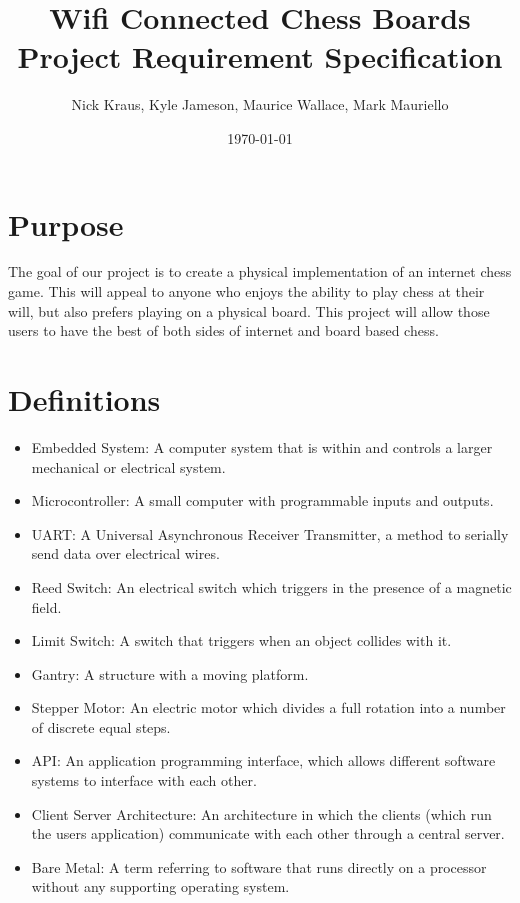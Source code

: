 \documentclass{article}
\title{Wifi Connected Chess Boards \\ \large Project Requirement Specification}
\author{Nick Kraus, Kyle Jameson, Maurice Wallace, Mark Mauriello}
\date{\today}
\begin{document}
\maketitle


\section*{Purpose}
\indent

The goal of our project is to create a physical implementation of an internet chess game. This will appeal to anyone who enjoys the ability to play chess at their will, but also prefers playing on a physical board. This project will allow those users to have the best of both sides of internet and board based chess.

\section*{Definitions}
\indent

\begin{itemize}
	
	\item Embedded System: A computer system that is within and controls a larger mechanical or electrical system.
	\item Microcontroller: A small computer with programmable inputs and outputs.
	\item UART: A Universal Asynchronous Receiver Transmitter, a method to serially send data over electrical wires.
	\item Reed Switch: An electrical switch which triggers in the presence of a magnetic field.
	\item Limit Switch: A switch that triggers when an object collides with it.
	\item Gantry: A structure with a moving platform.
	\item Stepper Motor: An electric motor which divides a full rotation into a number of discrete equal steps.
	\item API: An application programming interface, which allows different software systems to interface with each other.
	\item Client Server Architecture: An architecture in which the clients (which run the users application) communicate with each other through a central server.
	\item Bare Metal: A term referring to software that runs directly on a processor without any supporting operating system.

\end{itemize}
\end{document}
